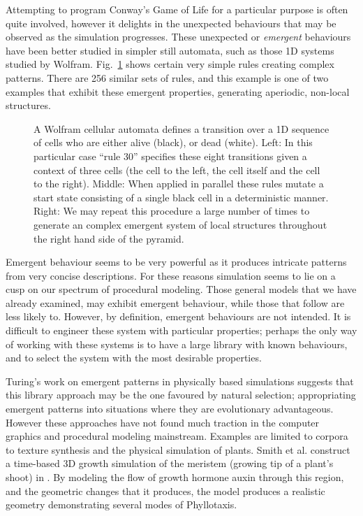 Attempting to program Conway's Game of Life for a particular purpose is often quite involved, however it delights in the unexpected behaviours that may be observed as the simulation progresses. These unexpected or \emph{emergent} behaviours have been better studied in simpler still automata, such as those 1D systems studied by Wolfram\cite{Wolfram03}. Fig.~\ref{fig:rule30} shows certain very simple rules creating complex patterns. There are 256 similar sets of rules, and this example is one of two examples that exhibit these emergent properties, generating aperiodic, non-local structures. 

\begin{figure}
\centering
\def\svgwidth{1.\columnwidth}

\caption[A Wolfram class VI automata]{\label{fig:rule30}A Wolfram cellular automata defines a transition over a 1D sequence of cells who are either alive (black), or dead (white). Left: In this particular case ``rule 30'' specifies these eight transitions given a context of three cells (the cell to the left, the cell itself and the cell to the right). Middle: When applied in parallel these rules mutate a start state consisting of a single black cell in a deterministic manner. Right: We may repeat this procedure a large number of times to generate an complex emergent system of local structures throughout the right hand side of the pyramid.}
\end{figure}

Emergent behaviour seems to be very powerful as it produces intricate patterns from very concise descriptions. For these reasons simulation seems to lie on a cusp on our spectrum of procedural modeling. Those general models that we have already examined, may exhibit emergent behaviour, while those that follow are less likely to. However, by definition, emergent behaviours are not intended. It is difficult to engineer these system with particular properties; perhaps the only way of working with these systems is to have a large library with known behaviours, and to select the system with the most desirable properties. 

Turing's work on emergent patterns in physically based simulations\cite{Turing52} suggests that this library approach may be the one favoured by natural selection; appropriating emergent patterns into situations where they are evolutionary advantageous. However these approaches have not found much traction in the computer graphics and procedural modeling mainstream. Examples are limited to corpora to texture synthesis \cite{Meinhardt87} and the physical simulation of plants. Smith et al. construct a time-based 3D growth simulation of the meristem (growing tip of a plant's shoot) in \cite{Smith06}. By modeling the flow of growth hormone auxin through this region, and the geometric changes that it produces, the model produces a realistic geometry demonstrating several modes of Phyllotaxis.

